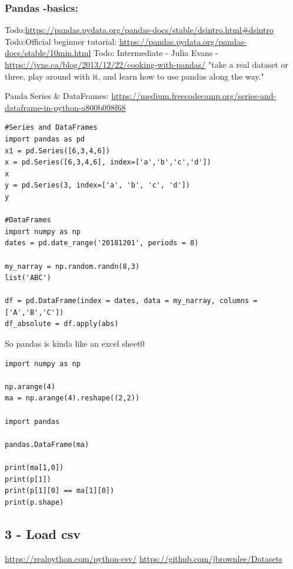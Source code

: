 \documentclass[11pt]{article}
\begin{document}
\subsubsection{Pandas -basics:}
\label{sec:org41f4dc3}
Todo:\url{https://pandas.pydata.org/pandas-docs/stable/dsintro.html\#dsintro}
Todo:Official beginner tutorial: \url{https://pandas.pydata.org/pandas-docs/stable/10min.html}
Todo: Intermediate - Julia Evans - \url{https://jvns.ca/blog/2013/12/22/cooking-with-pandas/}
"take a real dataset or three, play around with it, and learn how to use pandas along the way."


Panda Series \& DataFrames:
\url{https://medium.freecodecamp.org/series-and-dataframe-in-python-a800b098f68}
\begin{verbatim}
#Series and DataFrames
import pandas as pd
x1 = pd.Series([6,3,4,6])
x = pd.Series([6,3,4,6], index=['a','b','c','d'])
x
y = pd.Series(3, index=['a', 'b', 'c', 'd'])
y

#DataFrames
import numpy as np
dates = pd.date_range('20181201', periods = 8)

my_narray = np.random.randn(8,3)
list('ABC')

df = pd.DataFrame(index = dates, data = my_narray, columns = ['A','B','C'])
df_absolute = df.apply(abs)
\end{verbatim}

So pandas is kinda like an excel sheet0

\begin{verbatim}
import numpy as np

np.arange(4)
ma = np.arange(4).reshape((2,2))

import pandas

pandas.DataFrame(ma)

print(ma[1,0])
print(p[1])
print(p[1][0] == ma[1][0])
print(p.shape)
\end{verbatim}

\subsection{3 - Load csv}
\label{sec:orge793a23}
\url{https://realpython.com/python-csv/}
\url{https://github.com/jbrownlee/Datasets}
\end{document}
